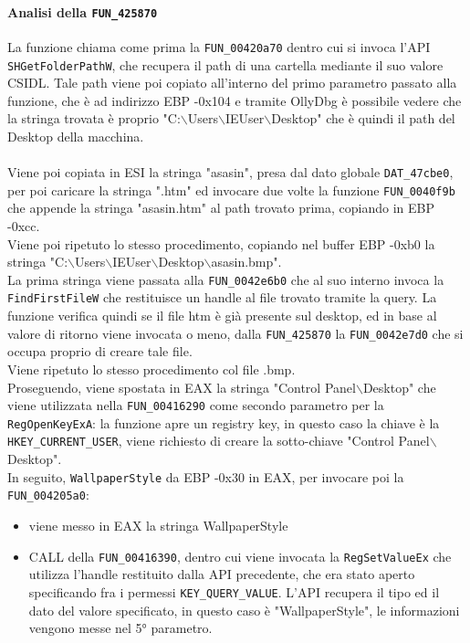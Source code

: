 \documentclass[12pt]{extarticle}
\begin{document}
\paragraph{Analisi della \texttt{FUN\_425870}} La funzione chiama come prima la \texttt{FUN\_00420a70} dentro cui si invoca l'API \texttt{SHGetFolderPathW}, che recupera il path di una cartella mediante il suo valore CSIDL. Tale path viene poi copiato all'interno del primo parametro passato alla funzione, che è ad indirizzo EBP -0x104 e tramite OllyDbg è possibile vedere che la stringa trovata è proprio "C:$\backslash$Users$\backslash$IEUser$\backslash$Desktop" che è quindi il path del Desktop della macchina.\\\\Viene poi copiata in ESI la stringa "asasin", presa dal dato globale \texttt{DAT\_47cbe0}, per poi caricare la stringa ".htm" ed invocare due volte la funzione \texttt{FUN\_0040f9b} che appende la stringa "asasin.htm" al path trovato prima, copiando in EBP -0xcc.\\Viene poi ripetuto lo stesso procedimento, copiando nel buffer EBP -0xb0 la stringa "C:$\backslash$Users$\backslash$IEUser$\backslash$Desktop$\backslash$asasin.bmp".\\La prima stringa viene passata alla \texttt{FUN\_0042e6b0} che al suo interno invoca la \texttt{FindFirstFileW} che restituisce un handle al file trovato tramite la query. La funzione verifica quindi se il file htm è già presente sul desktop, ed in base al valore di ritorno viene invocata o meno, dalla \texttt{FUN\_425870} la \texttt{FUN\_0042e7d0} che si occupa proprio di creare tale file.\\Viene ripetuto lo stesso procedimento col file .bmp.\\Proseguendo, viene spostata in EAX la stringa "Control Panel$\backslash$Desktop" che viene utilizzata nella \texttt{FUN\_00416290} come secondo parametro per la \texttt{RegOpenKeyExA}: la funzione apre un registry key, in questo caso la chiave è la \texttt{HKEY\_CURRENT\_USER}, viene richiesto di creare la sotto-chiave "Control Panel$\backslash$Desktop".\\In seguito, \texttt{WallpaperStyle} da EBP -0x30 in EAX, per invocare poi la \texttt{FUN\_004205a0}:
\begin{itemize}
    \item viene messo in EAX la stringa WallpaperStyle
    \item CALL della \texttt{FUN\_00416390}, dentro cui viene invocata la \texttt{RegSetValueEx} che utilizza l'handle restituito dalla API precedente, che era stato aperto specificando fra i permessi \texttt{KEY\_QUERY\_VALUE}. L'API recupera il tipo ed il dato del valore specificato, in questo caso è "WallpaperStyle", le informazioni vengono messe nel 5° parametro.
\end{itemize}
\end{document}
